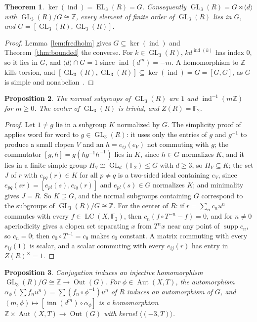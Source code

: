 \documentclass[11pt]{amsart}
\newtheorem{theorem}{Theorem}[section]
\newtheorem{proposition}[theorem]{Proposition}
\theoremstyle{remark}
\newcommand{\F}{\mathbb F}
\newcommand{\Z}{\mathbb Z}
\newcommand{\LC}{\operatorname{LC}}
\newcommand{\EL}{\operatorname{EL}}
\newcommand{\GL}{\operatorname{GL}}
\newcommand{\ind}{\operatorname{ind}}
\newcommand{\inn}{\operatorname{inn}}
\newcommand{\Out}{\operatorname{Out}}
\newcommand{\Aut}{\operatorname{Aut}}
\newcommand{\supp}{\operatorname{supp}}
\begin{document}
\begin{theorem}\label{thm:index}
$\ker(\ind)=\EL_3(R)=G$. Consequently $\GL_3(R)=G\rtimes\langle d\rangle$
with $\GL_3(R)/G\cong\Z$, every element of finite order of $\GL_3(R)$ lies
in $G$, and $G=[\GL_3(R),\GL_3(R)]$.
\end{theorem}

\begin{proof}
Lemma~\ref{lem:fredholm} gives $G\subseteq\ker(\ind)$ and
Theorem~\ref{thm:bounded} the converse. For $k\in\GL_3(R)$,
$kd^{\ind(k)}$ has index $0$, so it lies in $G$, and
$\langle d\rangle\cap G=1$ since $\ind(d^m)=-m$. A homomorphism to $\Z$
kills torsion, and $[\GL_3(R),\GL_3(R)]\subseteq\ker(\ind)=G=[G,G]$, as
$G$ is simple and nonabelian~\cite{Note}.
\end{proof}

\begin{proposition}\label{prop:normal}
The normal subgroups of $\GL_3(R)$ are $1$ and $\ind^{-1}(m\Z)$ for
$m\ge0$. The center of $\GL_3(R)$ is trivial, and $Z(R)=\F_2$.
\end{proposition}

\begin{proof}
Let $1\ne g$ lie in a subgroup $K$ normalized by $G$. The simplicity proof
of~\cite{Note} applies word for word to $g\in\GL_3(R)$: it uses only the
entries of $g$ and $g^{-1}$ to produce a small clopen $V$ and an
$h=e_{ij}(e_V)$ not commuting with $g$; the commutator $[g,h]=g(hg^{-1}h^{-1})$
lies in $K$, since $h\in G$ normalizes $K$, and it lies in a finite simple
group $H_V\cong\GL_d(\F_2)\le G$ with $d\ge3$, so $H_V\subseteq K$; the set
$J$ of $r$ with $e_{pq}(r)\in K$ for all $p\ne q$ is a two-sided ideal
containing $e_V$, since $e_{pq}(sr)=[e_{pl}(s),e_{lq}(r)]$ and $e_{pl}(s)\in G$
normalizes $K$; and minimality gives $J=R$. So $K\supseteq G$, and the
normal subgroups containing $G$ correspond to the subgroups of
$\GL_3(R)/G\cong\Z$. For the center of $R$: if $r=\sum_nc_nu^n$ commutes
with every $f\in\LC(X,\F_2)$, then $c_n(f\circ T^{-n}-f)=0$, and for
$n\ne0$ aperiodicity gives a clopen set separating $x$ from $T^nx$ near any
point of $\supp c_n$, so $c_n=0$; then $c_0\circ T^{-1}=c_0$ makes $c_0$
constant. A matrix commuting with every $e_{ij}(1)$ is scalar, and a
scalar commuting with every $e_{ij}(r)$ has entry in $Z(R)^\times=1$.
\end{proof}

\begin{proposition}\label{prop:out}
Conjugation induces an injective homomorphism $\GL_3(R)/G\cong\Z\to\Out(G)$.
For $\phi\in\Aut(X,T)$, the automorphism $\alpha_\phi(\sum f_nu^n)=\sum(f_n\circ\phi^{-1})u^n$
of $R$ induces an automorphism of $G$, and
$(m,\phi)\mapsto[\inn(d^m)\circ\alpha_\phi]$ is a homomorphism
$\Z\times\Aut(X,T)\to\Out(G)$ with kernel $\langle(-3,T)\rangle$.
\end{proposition}
\end{document}
